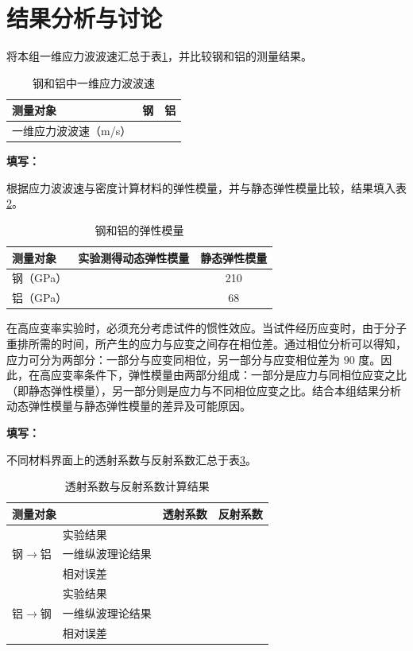 \documentclass[UTF8,a4paper,12pt]{ctexart}
\newcommand{\blank}[1][2.5cm]{\mbox{\underline{\hspace{#1}}}}
\newcommand{\answer}{\par\noindent\textbf{填写：}\blank[0.86\textwidth]\par}
\numberwithin{equation}{section}
\begin{document}
\section{结果分析与讨论}
将本组一维应力波波速汇总于表\ref{tab:exp1-speed-summary}，并比较钢和铝的测量结果。

\begin{table}[H]
\centering
\caption{钢和铝中一维应力波波速}
\label{tab:exp1-speed-summary}
\begin{tabular}{lcc}
\toprule
测量对象 & 钢 & 铝\\
\midrule
一维应力波波速（m/s） & \blank[2.5cm] & \blank[2.5cm]\\
\bottomrule
\end{tabular}
\end{table}
\answer

根据应力波波速与密度计算材料的弹性模量，并与静态弹性模量比较，结果填入表\ref{tab:exp1-modulus-summary}。

\begin{table}[H]
\centering
\caption{钢和铝的弹性模量}
\label{tab:exp1-modulus-summary}
\begin{tabular}{lcc}
\toprule
测量对象 & 实验测得动态弹性模量 & 静态弹性模量\\
\midrule
钢（GPa） & \blank[2.5cm] & 210\\
铝（GPa） & \blank[2.5cm] & 68\\
\bottomrule
\end{tabular}
\end{table}

在高应变率实验时，必须充分考虑试件的惯性效应。当试件经历应变时，由于分子重排所需的时间，所产生的应力与应变之间存在相位差。通过相位分析可以得知，应力可分为两部分：一部分与应变同相位，另一部分与应变相位差为 $90$ 度。因此，在高应变率条件下，弹性模量由两部分组成：一部分是应力与同相位应变之比（即静态弹性模量），另一部分则是应力与不同相位应变之比。结合本组结果分析动态弹性模量与静态弹性模量的差异及可能原因。
\answer

不同材料界面上的透射系数与反射系数汇总于表\ref{tab:exp1-coefficient-summary}。

\begin{table}[H]
\centering
\caption{透射系数与反射系数计算结果}
\label{tab:exp1-coefficient-summary}
\begin{tabular}{llcc}
\toprule
\multicolumn{2}{l}{测量对象} & 透射系数 & 反射系数\\
\midrule
\multirow{3}{*}{钢$\rightarrow$铝} & 实验结果 & \blank[1.8cm] & \blank[1.8cm]\\
 & 一维纵波理论结果 & \blank[1.8cm] & \blank[1.8cm]\\
 & 相对误差 & \blank[1.8cm] & \blank[1.8cm]\\
\midrule
\multirow{3}{*}{铝$\rightarrow$钢} & 实验结果 & \blank[1.8cm] & \blank[1.8cm]\\
 & 一维纵波理论结果 & \blank[1.8cm] & \blank[1.8cm]\\
 & 相对误差 & \blank[1.8cm] & \blank[1.8cm]\\
\bottomrule
\end{tabular}
\end{table}
\end{document}
